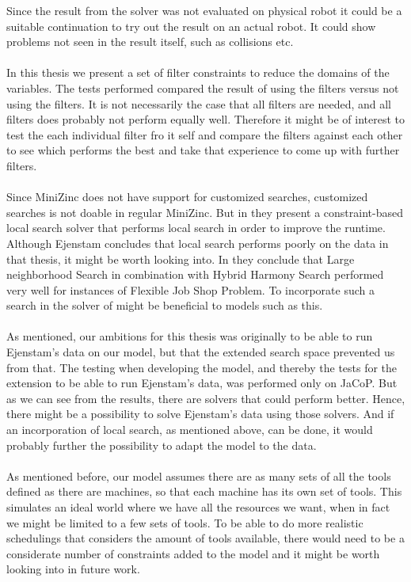 Since the result from the solver was not evaluated on physical robot it could be a suitable continuation to try out the result on an actual robot. It could show problems not seen in the result itself, such as collisions etc.
\\\\
In this thesis we present a set of filter constraints to reduce the domains of the variables. The tests performed compared the result of using the filters versus not using the filters. It is not necessarily the case that all filters are needed, and all filters does probably not perform equally well. Therefore it might be of interest to test the each individual filter fro it self and compare the filters against each other to see which performs the best and take that experience to come up with further filters.
\\\\
Since MiniZinc does not have support for customized searches, customized searches is not doable in regular MiniZinc. But in \cite{Bjordal} they present a constraint-based local search solver that performs local search in order to improve the runtime. Although Ejenstam concludes that local search performs poorly on the data in that thesis, it might be worth looking into. In \cite{yuan_2013} they conclude that Large neighborhood Search in combination with Hybrid Harmony Search performed very well for instances of Flexible Job Shop Problem. To incorporate such a search in the solver of \cite{Bjordal} might be beneficial to models such as this.
\\\\
As mentioned, our ambitions for this thesis was originally to be able to run Ejenstam's data on our model, but that the extended search space prevented us from that. The testing when developing the model, and thereby the tests for the extension to be able to run Ejenstam's data, was performed only on JaCoP. But as we can see from the results, there are solvers that could perform better. Hence, there might be a possibility to solve Ejenstam's data using those solvers. And if an incorporation of local search, as mentioned above, can be done, it would probably further the possibility to adapt the model to the data.
\\\\
As mentioned before, our model assumes there are as many sets of all the tools defined as there are machines, so that each machine has its own set of tools. This simulates an ideal world where we have all the resources we want, when in fact we might be limited to a few sets of tools. To be able to do more realistic schedulings that considers the amount of tools available, there would need to be a considerate number of constraints added to the model and it might be worth looking into in future work.
